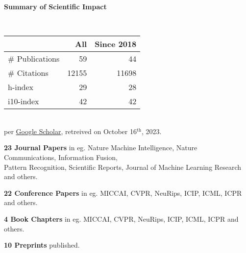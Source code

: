 \headedsection %
{\bf Summary of Scientific Impact}{}{}
{
    \qquad~~~~
    \begin{minipage}[t]{0.6\textwidth}
        \begin{tabular}{lrr}
        \hline
         & All & Since 2018\\
        \hline
        \# Publications & 59     & 44    \\
        \# Citations    & 12155  & 11698 \\
        h-index         & 29     & 28    \\
        i10-index       & 42     & 42    \\
        \hline
    \end{tabular}
    \\
    {\footnotesize{
        per \href{https://scholar.google.com/citations?user=wpLQuroAAAAJ}{Google Scholar},
        retreived on October 16$^\text{th}$, 2023.
        }
    }
    \end{minipage}

    \ifdefined\shortcv
        \vstep
        {\bf 23 Journal Papers} in eg. Nature Machine Intelligence, Nature Communications, Information Fusion,\\
        \hspace*{\fill} Pattern Recognition, Scientific Reports, Journal of Machine Learning Research and others.

        {\bf 22 Conference Papers} in eg. MICCAI, CVPR, NeuRips, ICIP, ICML, ICPR and others.

        {\bf 4 Book Chapters} in eg. MICCAI, CVPR, NeuRips, ICIP, ICML, ICPR and others.

        {\bf 10 Preprints} published.
        
    \else
        {}
    \fi

}
